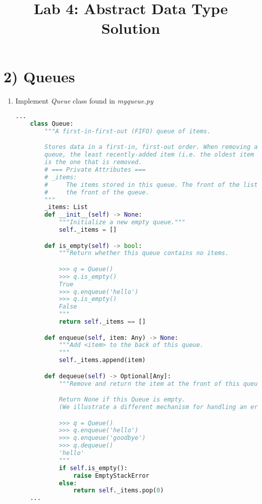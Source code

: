 \documentclass[12pt]{article}
\begin{document}
\title{Lab 4: Abstract Data Type Solution}
\date{}
\maketitle

\section*{2) Queues}
\begin{enumerate}[1.]
    \item Implement \textit{Queue} class found in \textit{myqueue.py}

    \begin{lstlisting}[language=Python,caption={task\_2\_q1\_solution.py},captionpos=b]
    ...
    class Queue:
        """A first-in-first-out (FIFO) queue of items.

        Stores data in a first-in, first-out order. When removing an item from the
        queue, the least recently-added item (i.e. the oldest item in the Queue)
        is the one that is removed.
        # === Private Attributes ===
        # _items:
        #     The items stored in this queue. The front of the list represents
        #     the front of the queue.
        """
        _items: List
        def __init__(self) -> None:
            """Initialize a new empty queue."""
            self._items = []

        def is_empty(self) -> bool:
            """Return whether this queue contains no items.

            >>> q = Queue()
            >>> q.is_empty()
            True
            >>> q.enqueue('hello')
            >>> q.is_empty()
            False
            """
            return self._items == []

        def enqueue(self, item: Any) -> None:
            """Add <item> to the back of this queue.
            """
            self._items.append(item)

        def dequeue(self) -> Optional[Any]:
            """Remove and return the item at the front of this queue.

            Return None if this Queue is empty.
            (We illustrate a different mechanism for handling an erroneous case.)

            >>> q = Queue()
            >>> q.enqueue('hello')
            >>> q.enqueue('goodbye')
            >>> q.dequeue()
            'hello'
            """
            if self.is_empty():
                raise EmptyStackError
            else:
                return self._items.pop(0)
    ...
    \end{lstlisting}


\end{enumerate}
\end{document}
